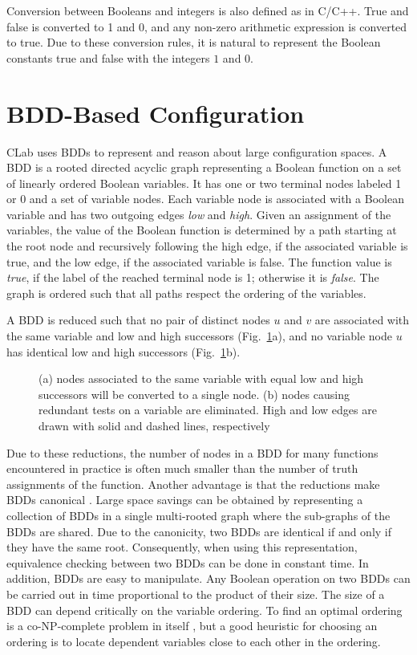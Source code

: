\documentclass{article}
\begin{document}
Conversion between Booleans and integers is also defined as in
C/C++. True and false is converted to 1 and 0, and any non-zero
arithmetic expression is converted to true. Due to these conversion
rules, it is natural to represent the Boolean constants true and false with
the integers $1$ and $0$. 

\section{BDD-Based Configuration}
\label{sec:bddbased}

CLab uses BDDs to represent and reason about large configuration
spaces. A BDD is a rooted directed acyclic graph representing a
Boolean function on a set of linearly ordered Boolean variables. It
has one or two terminal nodes labeled 1 or 0 and a set of variable
nodes. Each variable node is associated with a Boolean variable and
has two outgoing edges {\em low} and {\em high}. Given an assignment
of the variables, the value of the Boolean function is determined by a
path starting at the root node and recursively following the high
edge, if the associated variable is true, and the low edge, if the
associated variable is false. The function value is {\em true}, if the
label of the reached terminal node is 1; otherwise it is {\em
false}. The graph is ordered such that all paths respect the ordering
of the variables.

A BDD is reduced such that no pair of distinct nodes $u$ and $v$ are
associated with the same variable and low and high successors 
(Fig.~\ref{fig:bddEx}a), and no variable node $u$ has identical 
low and high successors (Fig.~\ref{fig:bddEx}b).
\begin{figure}[h!]
 \centering 
 \begin{center}
   \caption{\label{fig:bddEx}(a) nodes associated to the same variable 
            with equal low and high successors will be converted to a 
            single node. (b) nodes causing redundant tests on a variable 
            are eliminated. High and low edges are drawn with solid and 
            dashed lines, respectively}
 \end{center}
\end{figure}
Due to these reductions, the number of nodes in a BDD for many
functions encountered in practice is often much smaller than the
number of truth assignments of the function. Another advantage is that
the reductions make BDDs canonical \cite{B86}. Large space savings can be
obtained by representing a collection of BDDs in a single multi-rooted
graph where the sub-graphs of the BDDs are shared. Due to the
canonicity, two BDDs are identical if and only if they have the same
root. Consequently, when using this representation, equivalence
checking between two BDDs can be done in constant time. In addition,
BDDs are easy to manipulate. Any Boolean operation on two BDDs can be
carried out in time proportional to the product of their size. The
size of a BDD can depend critically on the variable ordering. To find
an optimal ordering is a co-NP-complete problem in itself \cite{B86}, but a
good heuristic for choosing an ordering is to locate dependent
variables close to each other in the ordering. 
\end{document}
